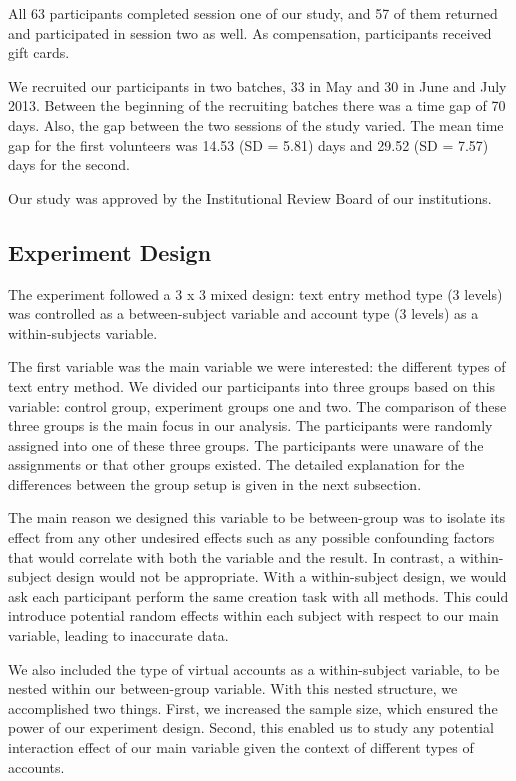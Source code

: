 \documentclass[conference]{IEEEtran}
\begin{document}
All 63 participants completed session one of our study, and 57 of them returned and participated in session two as well.
As compensation, participants received  gift cards.

We recruited our participants in two batches, 33 in May and 30 in June and July 2013.
Between the beginning of the recruiting batches there was a time gap of 70 days. Also, the gap between the two sessions of the study varied. The mean time gap for the first volunteers was 14.53 (SD = 5.81) days and 29.52 (SD = 7.57) days for the second.

Our study was approved by the Institutional Review Board of our institutions.

\subsection{Experiment Design}

The experiment followed a 3 x 3 mixed design: text entry method type (3 levels) was controlled as a between-subject variable and account type (3 levels) as a within-subjects variable.

The first variable was the main variable we were interested: the different types of text entry method. We divided our participants into three groups based on this variable: control group, experiment groups one and two. The comparison of these three groups is the main focus in our analysis. The participants were randomly assigned into one of these three groups. The participants were unaware of the assignments or that other groups existed. The detailed explanation for the differences between the group setup is given in the next subsection.

The main reason we designed this variable to be between-group was to isolate its effect from any other undesired effects such as any possible confounding factors that would correlate with both the variable and the result. In contrast, a within-subject design would not be appropriate. With a within-subject design, we would ask each participant perform the same creation task with all methods. This could introduce potential random effects within each subject with respect to our main variable, leading to inaccurate data.

We also included the type of virtual accounts as a within-subject variable, to be nested within our between-group variable. With this nested structure, we accomplished two things. First, we increased the sample size, which ensured the power of our experiment design. Second, this enabled us to study any potential interaction effect of our main variable given the context of different types of accounts.
\end{document}

